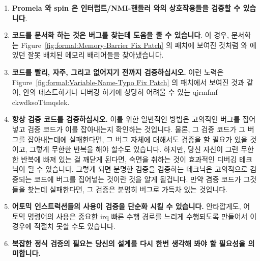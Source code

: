 \begin{enumerate}
\item	{\bf Promela 와 spin 은 인터럽트/NMI-핸들러 와의 상호작용들을 검증할 수
	있습니다}.
\item	{\bf 코드를 문서화 하는 것은 버그를 찾는데 도움을 줄 수 있습니다}.
	이 경우, 문서화는
	Figure~\ref{fig:formal:Memory-Barrier Fix Patch} 의 패치에 보여진
	것처럼  와  에 있던 잘못
	배치된 메모리 배리어들을 찾아냈습니다.
\item	{\bf 코드를 빨리, 자주, 그리고 없어지기 전까지 검증하십시오.}
	이런 노력은
	Figure~\ref{fig:formal:Variable-Name-Typo Fix Patch} 의 패치에서 보여진
	것과 같이,  안의 테스트하거나
	디버깅 하기에 상당히 어려울 수 있는 qjrmfmf ckwdksoTtmqslek.
\iffalse

\item	{\bf Promela and spin can verify interrupt/NMI-handler
	interactions}.
\item	{\bf Documenting code can help locate bugs}.
	In this case, the documentation effort located
	a misplaced memory barrier in
	\co{rcu_enter_nohz()} and \co{rcu_exit_nohz()},
	as shown by the patch in
	Figure~\ref{fig:formal:Memory-Barrier Fix Patch}.
\item	{\bf Validate your code early, often, and up to the point
	of destruction.}
	This effort located one subtle bug in
	\co{rcu_try_flip_waitack_needed()}
	that would have been quite difficult to test or debug, as
	shown by the patch in
	Figure~\ref{fig:formal:Variable-Name-Typo Fix Patch}.
\fi
\item	{\bf 항상 검증 코드를 검증하십시오.}
	이를 위한 일반적인 방법은 고의적인 버그를 집어넣고 검증 코드가 이를
	잡아내는지 확인하는 것입니다.
	물론, 그 검증 코드가 그 버그를 잡아내는데에 실패한다면, 그 버그 자체에
	대해서도 검증을 할 필요가 있을 것이고, 그렇게 무한한 반복을 해야 할수도
	있습니다.
	하지만, 당신 자신이 그런 무한한 반복에 빠져 있는 걸 깨닫게 된다면,
	숙면을 취하는 것이 효과적인 디버깅 테크닉이 될 수 있습니다.
	그렇게 되면 분명한 검증을 검증하는 테크닉은 고의적으로 검증되는 코드에
	버그를 집어넣는 것이란 것을 알게 될겁니다.
	만약 겸증 코드가 그것들을 찾는데 실패한다면, 그 검증은 분명히 버그로
	가득차 있는 것입니다.
\item	{\bf 어토믹 인스트럭션들의 사용이 검증을 단순화 시킬 수 있습니다.}
	안타깝게도,  어토믹 명령어의 사용은 중요한 irq 빠른 수행
	경로를 느리게 수행되도록 만들어서 이 경우에 적절치 못할 수도 있습니다.
\item	{\bf 복잡한 정식 검증의 필요는 당신의 설계를 다시 한번 생각해 봐야 할
	필요성을 의미합니다.}
\iffalse


\end{enumerate}
